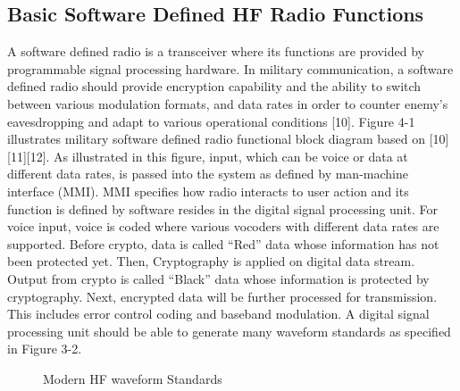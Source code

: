 \documentclass[conference]{IEEEtran}
\begin{document}
\subsection{Basic Software Defined HF Radio Functions}
A software defined radio is a transceiver where its functions are provided by programmable signal processing hardware. In military communication, a software defined radio should provide encryption capability and the ability to switch between various modulation formats, and data rates in order to counter enemy’s eavesdropping and adapt to various operational conditions [10]. Figure 4-1 illustrates military software defined radio functional block diagram based on [10][11][12]. As illustrated in this figure, input, which can be voice or data at different data rates, is passed into the system as defined by man-machine interface (MMI). MMI specifies how radio interacts to user action and its function is defined by software resides in the digital signal processing unit. For voice input, voice is coded where various vocoders with different data rates are supported. Before crypto, data is called “Red” data whose information has not been protected yet. Then, Cryptography is applied on digital data stream. Output from crypto is called “Black” data whose information is protected by cryptography. Next, encrypted data will be further processed for transmission. This includes error control coding and baseband modulation. A digital signal processing unit should be able to generate many waveform standards as specified in Figure 3-2. 

\begin{figure}[h!]
	\centering
	\caption{Modern HF waveform Standards}
\end{figure}
\end{document}
